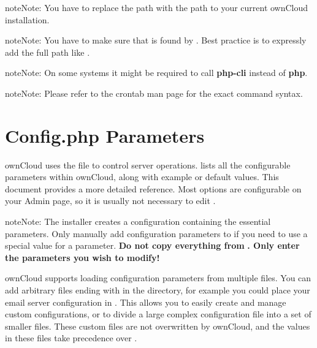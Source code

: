 \documentclass[letterpaper,10pt,english]{sphinxmanual}
\begin{document}
\begin{notice}{note}{Note:}
You have to replace the path  with the path to your current ownCloud installation.
\end{notice}

\begin{notice}{note}{Note:}
You have to make sure that  is found by . Best practice is to expressly add the full path like .
\end{notice}

\begin{notice}{note}{Note:}
On some systems it might be required to call \textbf{php-cli} instead of \textbf{php}.
\end{notice}

\begin{notice}{note}{Note:}
Please refer to the crontab man page for the exact command syntax.
\end{notice}


\section{Config.php Parameters}
\label{configuration_server/config_sample_php_parameters:config-php-parameters}\label{configuration_server/config_sample_php_parameters::doc}\label{configuration_server/config_sample_php_parameters:easycron}
ownCloud uses the  file to control server operations.
 lists all the configurable parameters within
ownCloud, along with example or default values. This document provides a more
detailed reference. Most options are configurable on your Admin page, so it
is usually not necessary to edit .

\begin{notice}{note}{Note:}
The installer creates a configuration containing the essential parameters.
Only manually add configuration parameters to  if you need to
use a special value for a parameter. \textbf{Do not copy everything from}
 \textbf{. Only enter the parameters you wish to modify!}
\end{notice}

ownCloud supports loading configuration parameters from multiple files.
You can add arbitrary files ending with  in the 
directory, for example you could place your email server configuration
in . This allows you to easily create and manage
custom configurations, or to divide a large complex configuration file
into a set of smaller files. These custom files are not overwritten by
ownCloud, and the values in these files take precedence over .
\end{document}
